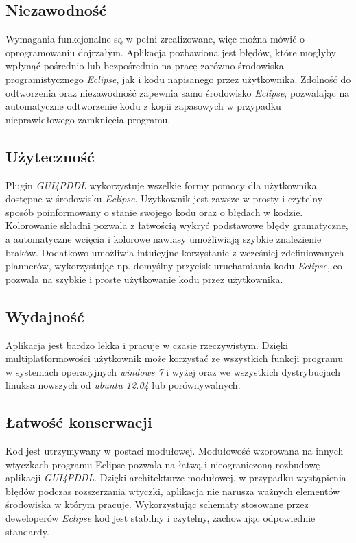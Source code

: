 \subsection{Niezawodność}
Wymagania funkcjonalne są w pełni zrealizowane, więc można mówić o oprogramowaniu dojrzałym. Aplikacja pozbawiona jest błędów, które mogłyby wpłynąć pośrednio lub bezpośrednio na pracę zarówno środowiska programistycznego \emph{Eclipse}, jak i kodu napisanego przez użytkownika. Zdolność do odtworzenia oraz niezawodność zapewnia samo środowisko \emph{Eclipse}, pozwalając na automatyczne odtworzenie kodu z kopii zapasowych w przypadku nieprawidłowego zamknięcia programu.
\subsection{Użyteczność}
Plugin \emph{GUI4PDDL} wykorzystuje wszelkie formy pomocy dla użytkownika dostępne w środowisku \emph{Eclipse}. Użytkownik jest zawsze w prosty i czytelny sposób poinformowany o stanie swojego kodu oraz o błędach w kodzie. Kolorowanie składni pozwala z łatwością wykryć podstawowe błędy gramatyczne, a automatyczne wcięcia i kolorowe nawiasy umożliwiają szybkie znalezienie braków. Dodatkowo umożliwia intuicyjne korzystanie z wcześniej zdefiniowanych plannerów, wykorzystując np. domyślny przycisk uruchamiania kodu \emph{Eclipse}, co pozwala na szybkie i proste użytkowanie kodu przez użytkownika.
\subsection{Wydajność}
Aplikacja jest bardzo lekka i pracuje w czasie rzeczywistym. Dzięki multiplatformowości użytkownik może korzystać ze wszystkich funkcji programu w systemach operacyjnych \emph{windows 7} i wyżej oraz we wszystkich dystrybucjach linuksa nowszych od \emph{ubuntu 12.04} lub porównywalnych.
\subsection{Łatwość konserwacji}
Kod jest utrzymywany w postaci modułowej. Modułowość wzorowana na innych wtyczkach programu Eclipse pozwala na łatwą i nieograniczoną rozbudowę aplikacji \emph{GUI4PDDL}. Dzięki architekturze modułowej, w przypadku wystąpienia błędów podczas rozszerzania wtyczki, aplikacja nie narusza ważnych elementów środowiska w którym pracuje. Wykorzystując schematy stosowane przez deweloperów \emph{Eclipse} kod jest stabilny i czytelny, zachowując odpowiednie standardy.



